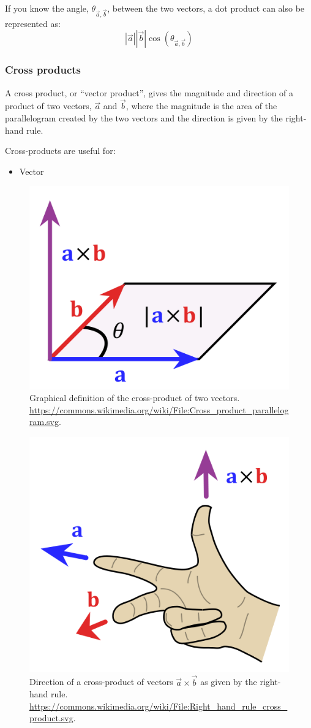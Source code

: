 \documentclass[a4paper,10pt]{scrartcl}
\begin{document}
If you know the angle, $\theta_{\vec{a},\vec{b}}$, between the two vectors, a dot product can also be represented as:
\begin{equation}
 \left| \vec{a} \right|  \left| \vec{b} \right| \cos{ \left( \theta_{\vec{a},\vec{b}} \right) }
\end{equation}

\subsubsection{Cross products}

A cross product, or ``vector product'', gives the magnitude and direction of a product of two vectors, $\vec{a}$ and $\vec{b}$, where the magnitude is the area of the parallelogram created by the two vectors and the direction is given by the right-hand rule.

Cross-products are useful for:
\begin{itemize}
 \item Vector 
\end{itemize}


\begin{figure}[ht!]
\begin{center}
 \includegraphics[width=.5\linewidth]{figures/NumericalAndMath/1280px-Cross_product_parallelogram.png}
\end{center}
 \caption{Graphical definition of the cross-product of two vectors. \url{https://commons.wikimedia.org/wiki/File:Cross_product_parallelogram.svg}.}
\end{figure}

\begin{figure}[ht!]
\begin{center}
 \includegraphics[width=.5\linewidth]{figures/NumericalAndMath/507px-Right_hand_rule_cross_product.png}
\end{center}
 \caption{Direction of a cross-product of vectors $\vec{a} \times \vec{b}$ as given by the right-hand rule. \url{https://commons.wikimedia.org/wiki/File:Right_hand_rule_cross_product.svg}.}
\end{figure}
\end{document}
